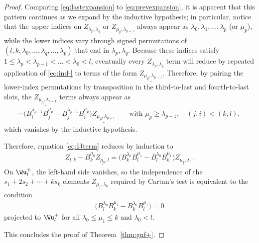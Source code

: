 \begin{proof}
Comparing \eqref{eq:lastexpansion} to \eqref{eq:prevexpansion}, it is apparent
that this pattern continues as we expand by the inductive hypothesis;
in particular, notice that the upper indices on $Z_{\lambda_{p}, \lambda_{q}}$
or $\underline{Z_{\mu_{p},\lambda_{p-1}}}$
always appear as $\lambda_0, \lambda_1, \ldots, \lambda_p$ (or $\mu_p$), while the lower indices
vary through signed permutations of $(l,k,\lambda_0, \ldots,
\lambda_q, \ldots, \lambda_p)$ that end in  $\lambda_p,\lambda_q$.
Because these indices satisfy $1 \leq \lambda_p < \lambda_{p-1} < \dots < \lambda_0 < l$, eventually
every $Z_{\lambda_p, \lambda_q}$ term will reduce by repeated application of
\eqref{eq:ind-} to terms of the
form $\underline{Z_{\mu_p,\lambda_{p-1}}}$.  Therefore,
by pairing the lower-index permutations by transposition in the third-to-last
and fourth-to-last slots, the $\underline{Z_{\mu_{p},\lambda_{p-1}}}$ terms always appear as
\begin{gather*}
\cdots
\big(B^{\lambda_{p-1}}_iB^{\mu_{p}}_j
- B^{\lambda_{p-1}}_jB^{\mu_{p}}_i\big)\underline{Z_{\mu_{p},\lambda_{p-1}}} \qquad
\text{with $\mu_{p} \geq \lambda_{p-1},\quad (j,i) < (k,l)$},
\end{gather*} which vanishes by the
inductive hypothesis.

Therefore, equation \eqref{eq:IJterm} reduces by induction to
\begin{gather*}
Z_{l,k}  -B_k^{\mu_0} \underline{Z_{\mu_0,l}} =
\big(B_{k}^{\lambda_0}B_{l}^{\mu_1} - B_{l}^{\lambda_0}B_{k}^{\mu_1}\big)
\underline{Z_{\mu_1,\lambda_0}}.
\end{gather*}
On $\Wu^+_l$, the left-hand side vanishes, so the independence of the
$s_1 + 2s_2 + \cdots + k s_k$ elements
$\underline{Z_{\mu_1,\lambda_0}}$ required by Cartan's test is equivalent to
the condition
\begin{gather*}
\big(B_{l}^{\lambda_0}B_{k}^{\mu_1} - B_{k}^{\lambda_0}B_{l}^{\mu_1}\big)
=0
\end{gather*}
projected to $\Wu^+_l$ for all $\lambda_0 \leq \mu_1  \leq k$ and $\lambda_0 < l$.

This concludes the proof of Theorem~\ref{thm:gnf+}.
\end{proof}
